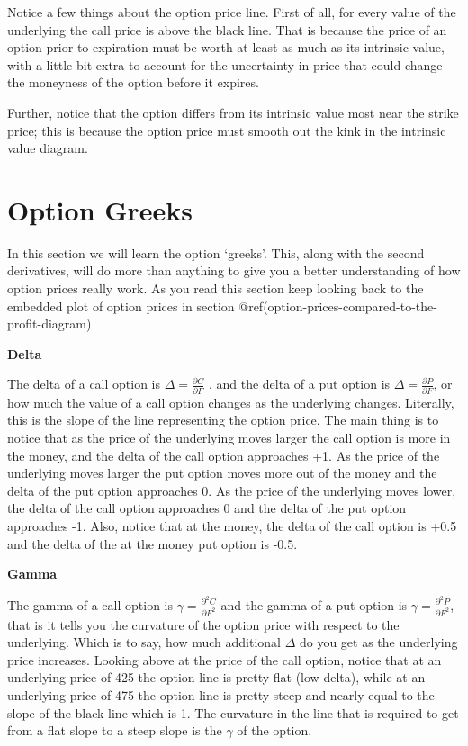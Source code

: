 \documentclass[
  letterpaper,
  DIV=11,
  numbers=noendperiod]{scrreprt}
\begin{document}
Notice a few things about the option price line. First of all, for every
value of the underlying the call price is above the black line. That is
because the price of an option prior to expiration must be worth at
least as much as its intrinsic value, with a little bit extra to account
for the uncertainty in price that could change the moneyness of the
option before it expires.

Further, notice that the option differs from its intrinsic value most
near the strike price; this is because the option price must smooth out
the kink in the intrinsic value diagram.

\section{Option Greeks}\label{option-greeks}

In this section we will learn the option `greeks'. This, along with the
second derivatives, will do more than anything to give you a better
understanding of how option prices really work. As you read this section
keep looking back to the embedded plot of option prices in section
@ref(option-prices-compared-to-the-profit-diagram)

\textbf{Delta}

The delta of a call option is \(\Delta = \frac{\partial C}{\partial F}\)
, and the delta of a put option is
\(\Delta = \frac{\partial P}{\partial F}\), or how much the value of a
call option changes as the underlying changes. Literally, this is the
slope of the line representing the option price. The main thing is to
notice that as the price of the underlying moves larger the call option
is more in the money, and the delta of the call option approaches +1. As
the price of the underlying moves larger the put option moves more out
of the money and the delta of the put option approaches 0. As the price
of the underlying moves lower, the delta of the call option approaches 0
and the delta of the put option approaches -1. Also, notice that at the
money, the delta of the call option is +0.5 and the delta of the at the
money put option is -0.5.

\textbf{Gamma}

The gamma of a call option is
\(\gamma = \frac{\partial^2 C}{\partial F^2}\) and the gamma of a put
option is \(\gamma = \frac{\partial^2 P}{\partial F^2}\), that is it
tells you the curvature of the option price with respect to the
underlying. Which is to say, how much additional \(\Delta\) do you get
as the underlying price increases. Looking above at the price of the
call option, notice that at an underlying price of 425 the option line
is pretty flat (low delta), while at an underlying price of 475 the
option line is pretty steep and nearly equal to the slope of the black
line which is 1. The curvature in the line that is required to get from
a flat slope to a steep slope is the \(\gamma\) of the option.
\end{document}
